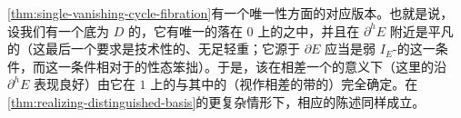 \noqed
\cref{thm:single-vanishing-cycle-fibration}有一个唯一性方面的对应版本。也就是说，设我们有一个底为 $D$ 的\trLefschetzFibration{}，它有唯一的\trCriticalPoint{}落在 $0$ 上的\trFiber{}之中，并且在 $\partial^hE$ 附近是平凡的（这最后一个要求是技术性的、无足轻重；它源于 $\partial E$ 应当是弱 $I_E$-\trConvex{}的这一条件，而这一条件相对于\trSymplectic\trConnection{}的\trDeformation{}性态笨拙）。于是，该\trFibration{}在相差一个\trDeformation{}的意义下（这里的\trDeformation{}沿 $\partial^hE$ 表现良好）由它在 $1$ 上的\trFiber{}与其中的\trVanishingCycle{}（视作相差\trIsotopy{}的带\trFrame{}的\trLagrange\trSphere{}）完全确定。在\cref{thm:realizing-distinguished-basis}的更复杂情形下，相应的陈述同样成立。
